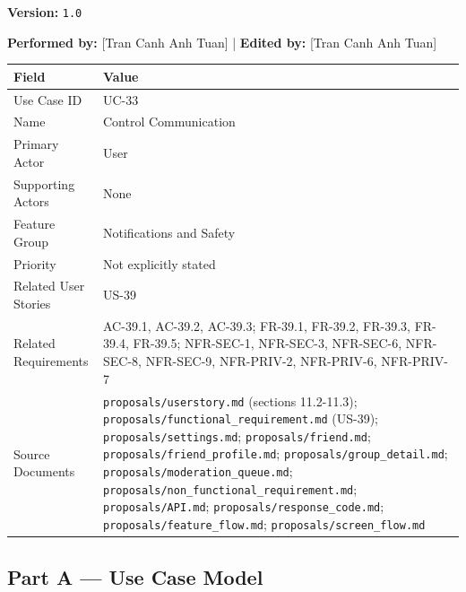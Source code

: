 \documentclass[12pt]{article}
\renewcommand{\baselinestretch}{1.5}
\begin{document}
\textbf{Version:} \texttt{1.0}
\par\medskip

\textbf{Performed by:} [Tran Canh Anh Tuan] | \textbf{Edited by:} [Tran Canh Anh Tuan]
\par\medskip

\begingroup
\small
\renewcommand{\baselinestretch}{1.0}\selectfont
\renewcommand{\arraystretch}{1.15}
\setlength{\tabcolsep}{6pt}
\begin{longtable}{|>{\raggedright\arraybackslash}p{}|>{\raggedright\arraybackslash}p{}|}
\hline
\textbf{Field} & \textbf{Value} \\ \hline
\endhead
Use Case ID & UC-33 \\ \hline
Name & Control Communication \\ \hline
Primary Actor & User \\ \hline
Supporting Actors & None \\ \hline
Feature Group & Notifications and Safety \\ \hline
Priority & Not explicitly stated \\ \hline
Related User Stories & US-39 \\ \hline
Related Requirements & AC-39.1, AC-39.2, AC-39.3; FR-39.1, FR-39.2, FR-39.3, FR-39.4, FR-39.5; NFR-SEC-1, NFR-SEC-3, NFR-SEC-6, NFR-SEC-8, NFR-SEC-9, NFR-PRIV-2, NFR-PRIV-6, NFR-PRIV-7 \\ \hline
Source Documents & \texttt{proposals/userstory.md} (sections 11.2-11.3); \texttt{proposals/functional\_requirement.md} (US-39); \texttt{proposals/settings.md}; \texttt{proposals/friend.md}; \texttt{proposals/friend\_profile.md}; \texttt{proposals/group\_detail.md}; \texttt{proposals/moderation\_queue.md}; \texttt{proposals/non\_functional\_requirement.md}; \texttt{proposals/API.md}; \texttt{proposals/response\_code.md}; \texttt{proposals/feature\_flow.md}; \texttt{proposals/screen\_flow.md} \\ \hline
\end{longtable}
\endgroup
\par\medskip

\hypertarget{sec:part-a-use-case-model}{}
\subsection*{Part A --- Use Case Model}
\par\medskip

\hypertarget{sec:a1-focused-use-case-diagram}{}
\end{document}
